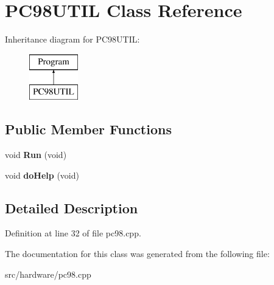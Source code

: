 \hypertarget{classPC98UTIL}{\section{P\-C98\-U\-T\-I\-L Class Reference}
\label{classPC98UTIL}
}
Inheritance diagram for P\-C98\-U\-T\-I\-L\-:\begin{figure}[H]
\begin{center}
\leavevmode
\includegraphics[height=2.000000cm]{classPC98UTIL}
\end{center}
\end{figure}
\subsection*{Public Member Functions}
\begin{DoxyCompactItemize}
\item 
\hypertarget{classPC98UTIL_a707ed1ec88edc877739dc492b9b2d752}{void {\bfseries Run} (void)}\label{classPC98UTIL_a707ed1ec88edc877739dc492b9b2d752}

\item 
\hypertarget{classPC98UTIL_acfb7033342820a8d47b88310b7c4a27d}{void {\bfseries do\-Help} (void)}\label{classPC98UTIL_acfb7033342820a8d47b88310b7c4a27d}

\end{DoxyCompactItemize}


\subsection{Detailed Description}


Definition at line 32 of file pc98.\-cpp.



The documentation for this class was generated from the following file\-:\begin{DoxyCompactItemize}
\item 
src/hardware/pc98.\-cpp\end{DoxyCompactItemize}
